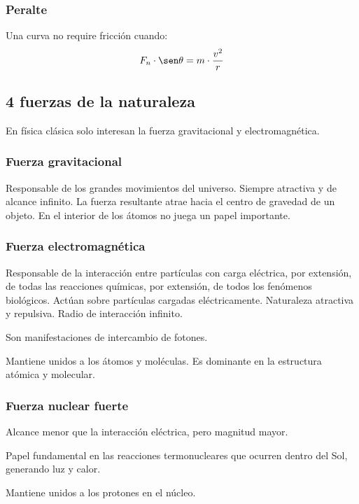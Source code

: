 \documentclass[12pt]{article}
\begin{document}
\subsubsection{Peralte}

Una curva no require fricción cuando:
\begin{align*}
  F_{n}\cdot \sen\theta = m \cdot \frac{v^{2}}{r}
\end{align*}

\subsection{4 fuerzas de la naturaleza}

En física clásica solo interesan la fuerza gravitacional y electromagnética.

\subsubsection{Fuerza gravitacional}

Responsable de los grandes movimientos del universo.
Siempre atractiva y de alcance infinito.
La fuerza resultante atrae hacia el centro de gravedad de un objeto.
En el interior de los átomos no juega un papel importante.

\subsubsection{Fuerza electromagnética}

Responsable de la interacción entre partículas con carga eléctrica,
por extensión,
de todas las reacciones químicas,
por extensión,
de todos los fenómenos biológicos.
Actúan sobre partículas cargadas eléctricamente.
Naturaleza atractiva y repulsiva.
Radio de interacción infinito.

Son manifestaciones de intercambio de fotones.

Mantiene unidos a los átomos y moléculas.
Es dominante en la estructura atómica y molecular.

\subsubsection{Fuerza nuclear fuerte}

Alcance menor que la interacción eléctrica, pero magnitud mayor.

Papel fundamental en las reacciones termonucleares que ocurren dentro del Sol,
generando luz y calor.

Mantiene unidos a los protones en el núcleo.
\end{document}

